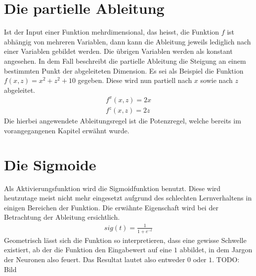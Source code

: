 \section{Die partielle Ableitung}
Ist der Input einer Funktion mehrdimensional, das heisst, die Funktion $f$ ist abhängig von mehreren Variablen, dann
kann die Ableitung jeweils lediglich nach einer Variablen gebildet werden. Die übrigen Variablen werden als konstant
angesehen. In dem Fall beschreibt die partielle Ableitung die Steigung an einem bestimmten Punkt der abgeleiteten
Dimension. Es sei als Beispiel die Funktion $f(x, z) = x^2 + z^2 + 10$ gegeben. Diese wird nun partiell nach $x$ sowie
nach $z$ abgeleitet.
\begin{align}
    f^x(x, z) = 2x\\
    f^z(x, z) = 2z
\end{align}
Die hierbei angewendete Ableitungsregel ist die Potenzregel, welche bereits im vorangegangenen Kapitel erwähnt wurde.

\section{Die Sigmoide}
Als Aktivierungsfunktion wird die Sigmoidfunktion benutzt. Diese wird heutzutage meist nicht mehr eingesetzt aufgrund
des schlechten Lernverhaltens in einigen Bereichen der Funktion. Die erwähnte Eigenschaft wird bei der Betrachtung
der Ableitung ersichtlich.
\begin{align}
    sig(t) = \frac{1}{1 + e^{-t}}
\end{align}
Geometrisch lässt sich die Funktion so interpretieren, dass eine gewisse Schwelle existiert, ab der die Funktion
den Eingabewert auf eine $1$ abbildet, in dem Jargon der Neuronen also \glqq feuert\grqq. Das Resultat lautet also
entweder $0$ oder $1$.
TODO: Bild

